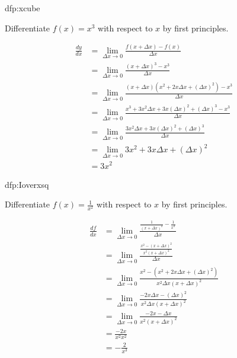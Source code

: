 %

\begin{defproblem}{dfp:xcube}%
 \begin{onlyproblem}%
 Differentiate $f(x) = x^3$ with respect to $x$ by first
 principles.%
 \end{onlyproblem}%
 \begin{onlysolution}%
 \begin{align*}
 \frac{dy}{dx} & = \lim_{\Delta x\rightarrow 0}\frac{f(x+\Delta x) - f(x)}{\Delta x}\\
  & = \lim_{\Delta x\rightarrow 0}\frac{(x+\Delta x)^3-x^3}{\Delta x}\\
  & = \lim_{\Delta x\rightarrow 0}\frac{(x+\Delta x)(x^2+2x\Delta x+(\Delta x)^2)-x^3}{\Delta x}\\
  & = \lim_{\Delta x\rightarrow 0}\frac{x^3+3x^2\Delta x+3x(\Delta x)^2+(\Delta x)^3-x^3}{\Delta x}\\
  & = \lim_{\Delta x\rightarrow 0}\frac{3x^2\Delta x+3x(\Delta x)^2+(\Delta x)^3}{\Delta x}\\
  & = \lim_{\Delta x\rightarrow 0}3x^2+3x\Delta x + (\Delta x)^2\\
  & = 3x^2
 \end{align*}%
 \end{onlysolution}%
\end{defproblem}

\begin{defproblem}{dfp:Ioverxsq}%
 \begin{onlyproblem}%
 Differentiate $\displaystyle f(x) = \frac{1}{x^2}$ with respect to
 $x$ by first principles.%
 \end{onlyproblem}%
 \begin{onlysolution}%
\begin{align*}
 \frac{df}{dx} & = \lim_{\Delta x\rightarrow 0}\frac{\frac{1}{(x+\Delta x)^2}-\frac{1}{x^2}}{\Delta x}\\
  & = \lim_{\Delta x\rightarrow 0}\frac{\frac{x^2-(x+\Delta x)^2}{x^2(x+\Delta x)^2}}{\Delta x}\\
  & = \lim_{\Delta x\rightarrow 0}\frac{x^2-(x^2+2x\Delta x+(\Delta x)^2)}{x^2\Delta x(x+\Delta x)^2}\\
  & = \lim_{\Delta x\rightarrow 0}\frac{-2x\Delta x-(\Delta x)^2}{x^2\Delta x(x+\Delta x)^2}\\
  & = \lim_{\Delta x\rightarrow 0}\frac{-2x-\Delta x}{x^2(x+\Delta x)^2}\\
  & = \frac{-2x}{x^2x^2}\\
  & = -\frac{2}{x^3}
 \end{align*}%
 \end{onlysolution}%
\end{defproblem}

